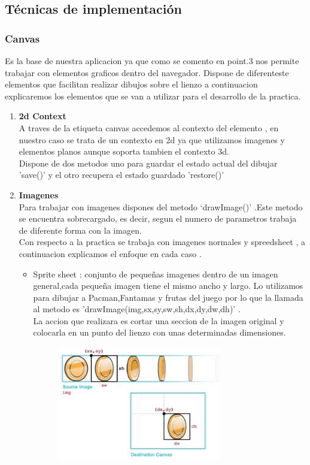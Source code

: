 \subsection{Técnicas de implementación}
\subsubsection{Canvas}
Es la base de nuestra aplicacion  ya que como se comento en point.3 nos permite trabajar con elementos graficos dentro del navegador.
Dispone de diferenteste elementos que facilitan realizar dibujos sobre el lienzo a continuacion explicaremos los elementos que se van a utilizar para el desarrollo de la practica.
\begin{enumerate}
\item \textbf{2d Context}\\ A traves de la etiqueta canvas accedemos al contexto del elemento , en nuestro caso se trata de un contexto en 2d ya que utilizamos  imagenes y elementos planos aunque soporta tambien el contexto 3d.\\Dispone de dos metodos uno para guardar el estado actual del dibujar 'save()' y el otro recupera el estado guardado  'restore()'
\item \textbf{Imagenes}\\ Para trabajar con imagenes dispones del metodo ‘drawImage()’ .Este metodo se encuentra sobrecargado, es decir, segun el numero de parametros  trabaja de diferente forma con la imagen.\\ Con respecto a la practica se trabaja con imagenes normales y spreedsheet , a continuacion explicamos el enfoque en cada caso .
\begin{itemize}
\item Sprite sheet :  conjunto de pequeñas imagenes dentro de un imagen general,cada pequeña imagen tiene el mismo ancho y largo. Lo utilizamos para dibujar a Pacman,Fantamas y frutas del juego por lo que la llamada al metodo es  'drawImage(img,sx,sy,sw,sh,dx,dy,dw,dh)' .\\ La accion que realizara es cortar una seccion de la imagen original y colocarla en un punto del lienzo con unas determinadas dimensiones.\begin{figure}[h]
\begin{center}
   \includegraphics[width=0.5\linewidth, height=5cm]{Figures/SpreedSheet}

\end{center}
\end{figure}
\end{itemize}
\end{enumerate}
